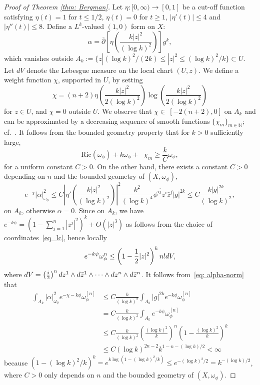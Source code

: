 \documentclass[a4paper, 11pt]{amsart}
\theoremstyle{plain}
\numberwithin{equation}{section} %
\numberwithin{figure}{section} %
\theoremstyle{plain}
\theoremstyle{plain}
\theoremstyle{plain}
\theoremstyle{plain}
\theoremstyle{remark}
\theoremstyle{definition}
\theoremstyle{definition}
\DeclareMathOperator \ddc{\textrm{dd}^c}
\begin{document}
\begin{proof}[Proof of Theorem \ref{thm: Bergman}]
\medskip
Let $\eta: [0,\infty)\to [0,1]$ be a cut-off function satisfying $\eta(t) = 1$ for $t\leq 1/2$, $\eta(t)= 0$ for $t\geq 1$, $ |\eta'(t)|\leq 4$ and $ |\eta''(t)|\leq 8$. Define a $L^k$-valued $(1,0)$ form on $X$:
$$\alpha=\bar \partial \left[\eta\left(\frac{k|z|^2}{(\log k)^2}\right)\right] g^{k},$$
which vanishes outside $A_k:=\{z| (\log k)^2/(2k)\leq |z|^2\leq (\log k)^2/k\}\subset U$. Let $dV$ denote the Lebesgue measure on the local chart $(U,z)$. We define a weight function $\chi$, supported in $U$, by setting \[\chi=(n+2)\eta\left(\frac{k|z|^2}{2(\log k)^2}\right)\log\left(\frac{k|z|^2}{2(\log k)^2}\right) \]
for $z\in U$, and $\chi=0$ outside $U$.
We observe that $\chi\in \ [-2(n+2), 0]$ on $A_k$  and can be approximated by a decreasing sequence of smooth functions $\{\chi_m\}_{m\in\mathbb{N}}$; cf.~\cite[pages 104--105]{Tian90-metrics-algebraic}.
It follows from the bounded geometry property that for $k>0$ sufficiently large, 
$$\textrm{Ric}(\omega_\phi)+k\omega_\phi+\ddc\chi_m \geq \frac{k}{C} \omega_{\phi},$$
for a uniform constant $C>0$. 
On the other hand, there exists a constant $C>0$ depending on $n$ and the bounded geometry of $(X,\omega_\phi)$,
\begin{equation}\label{eq: alpha-norm}
    e^{-\chi}|\alpha|^2_{\omega_\phi} \leq  C\left|\eta'\left(\frac{k|z|^2}{(\log k)^2}\right)\right|^2 \frac{k^2 }{(\log k)^4} \phi^{i\bar j}z^i\bar z^j |g|^{2k}\leq C \frac{k |g|^{2k}}{(\log k)^2} ,
\end{equation}   on $A_k$, otherwise $\alpha=0$. Since on $A_k$, we have 
$e^{-k\psi} = (1- \sum_{j=1}^n  |z ^j|^2)^k + O(|z|^{3})$ as follows from the choice of coordinates~\eqref{eq_lc}, hence locally
$$e^{-k\psi}\omega_\phi^n\leq \left(1-\frac{1 }{2}|z|^2\right )^k n!{\rm d}V_{},$$
where ${\rm d}V=\left(\frac{i}{2} \right)^n dz^1\wedge d\Bar{z}^1\wedge\cdots\wedge dz^n\wedge d\Bar{z}^n$.
It follows from~\eqref{eq: alpha-norm} that
\begin{align}    \label{eq_est_alpha}\int_{A_k}|\alpha|^2_{\omega_\phi}e^{-\chi-k\phi}\omega_\phi^{[n]}&\leq C\frac{k}{(\log k)^2}\int_{A_k}|g|^{2k}e^{-k\phi}\omega_\phi^{[n]}\\ \nonumber
    &=C\frac{k}{(\log k)^2}\int_{A_k}e^{-k\psi}\omega_\phi^{[n]}\\ \nonumber
    &\leq C\frac{k}{(\log k)^2}\left(\frac{(\log k)^2}{k} \right)^n \left( 1-\frac{(\log k)^2}{k}\right)^k\\ \nonumber
    &\leq C(\log k)^{2n-2}k^{1-n-(\log k)/2}<\infty \nonumber
\end{align} 
because $(1-(\log k)^2/k)^k=e^{k\log(1-(\log k)^2/k)}\leq e^{-(\log k)^2/2}=k^{-(\log k)/2}$, where $C>0$ only depends on $n$ and the bounded geometry of $(X,\omega_\phi)$.


\end{proof}
\end{document}
